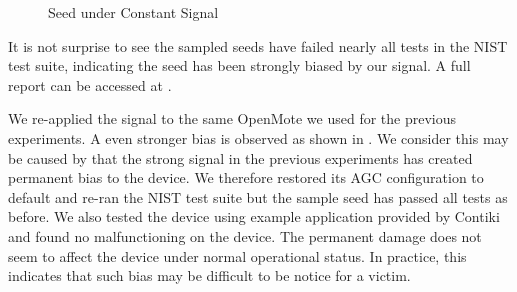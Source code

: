 \begin{figure}[!t]
\centering
{}
\hfil
{}
\caption{Seed under Constant Signal}
\label{ConstantSignalBiased}
\end{figure}

It is not surprise to see the sampled seeds have failed nearly all tests in the NIST test suite, indicating the seed has been strongly biased by our signal. A full report can be accessed at \cite{prngtest}.

We re-applied the signal to the same OpenMote we used for the previous experiments. A even stronger bias is observed as shown in . We consider this may be caused by that the strong signal in the previous experiments has created permanent bias to the device. We therefore restored its AGC configuration to default and re-ran the NIST test suite but the sample seed has passed all tests as before. We also tested the device using example application provided by Contiki and found no malfunctioning on the device. The permanent damage does not seem to affect the device under normal operational status. In practice, this indicates that such bias may be difficult to be notice for a victim.

